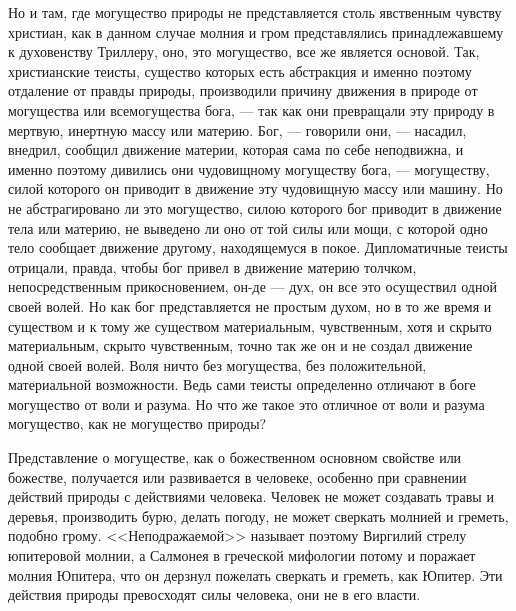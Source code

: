 \documentclass[12pt]{article}
\begin{document}
Но и там, где могущество природы не представляется столь явственным чувству христиан, как в данном случае молния и гром представлялись принадлежавшему к духовенству Триллеру, оно, это могущество, все же является основой. Так, христианские теисты, существо которых есть абстракция и именно поэтому отдаление от правды природы, производили причину движения в природе от могущества или всемогущества бога, --- так как они превращали эту природу в мертвую, инертную массу или материю. Бог, --- говорили они, --- насадил, внедрил, сообщил движение материи, которая сама по себе неподвижна, и именно поэтому дивились они чудовищному могуществу бога, --- могуществу, силой которого он приводит в движение эту чудовищную массу или машину. Но не абстрагировано ли это могущество, силою которого бог приводит в движение тела или материю, не выведено ли оно от той силы или мощи, с которой одно тело сообщает движение другому, находящемуся в покое. Дипломатичные теисты отрицали, правда, чтобы бог привел в движение материю толчком, непосредственным прикосновением, он-де --- дух, он все это осуществил одной своей волей. Но как бог представляется не простым духом, но в то же время и существом и к тому же существом материальным, чувственным, хотя и скрыто материальным, скрыто чувственным, точно так же он и не создал движение одной своей волей. Воля ничто без могущества, без положительной, материальной возможности. Ведь сами теисты определенно отличают в боге могущество от воли и разума. Но что же такое это отличное от воли и разума могущество, как не могущество природы? 

Представление о могуществе, как о божественном основном свойстве или божестве, получается или развивается в человеке, особенно при сравнении действий природы с действиями человека. Человек не может создавать травы и деревья, производить бурю, делать погоду, не может сверкать молнией и греметь, подобно грому. <<Неподражаемой>> называет поэтому Виргилий стрелу юпитеровой молнии, а Салмонея в греческой мифологии потому и поражает молния Юпитера, что он дерзнул пожелать сверкать и греметь, как Юпитер. Эти действия природы превосходят силы человека, они не в его власти. 
\end{document}
